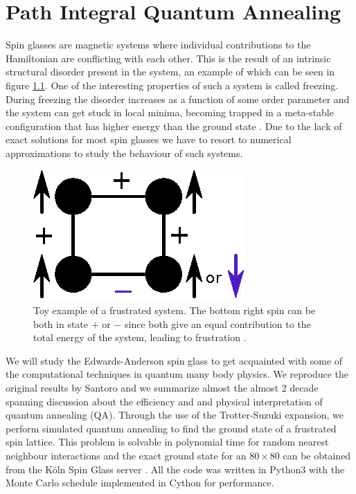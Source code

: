 \chapter{Path Integral Quantum Annealing}

Spin glasses are magnetic systems where individual contributions to the Hamiltonian are conflicting with each other. This is the result of an intrinsic structural disorder present in the system, an example of which can be seen in figure \ref{fig:frustration}. One of the interesting properties of such a system is called freezing. During freezing the disorder increases as a function of some order parameter and the system can get stuck in local minima, becoming trapped in a meta-stable configuration that has higher energy than the ground state  \cite{Binder1986}. Due to the lack of exact solutions for most spin glasses we have to resort to numerical approximations to study the behaviour of such systems. 
\begin{figure}[h]
    \centering
    \includegraphics{figures/chapter2/frustration.eps}
    \caption{Toy example of a frustrated system. The bottom right spin can be both in state $+$ or $-$ since both give an equal contribution to the total energy of the system, leading to frustration \cite{Mydosh2015}.}
    \label{fig:frustration}
\end{figure}
We will study the Edwards-Anderson spin glass to get acquainted with some of the computational techniques in quantum many body physics. We reproduce the original results by Santoro \cite{Santoro2002} and we summarize almost the almost 2 decade spanning discussion about the efficiency and and physical interpretation of quantum annealing (QA). Through the use of the Trotter-Suzuki expansion, we perform simulated quantum annealing to find the ground state of a frustrated spin lattice. This problem is solvable in polynomial time for random nearest neighbour interactions and the exact ground state for an $80\times80$ can be obtained from the K\"oln Spin Glass server \cite{spinglass}. All the code was written in Python3 with the Monte Carlo schedule implemented in Cython for performance. 

